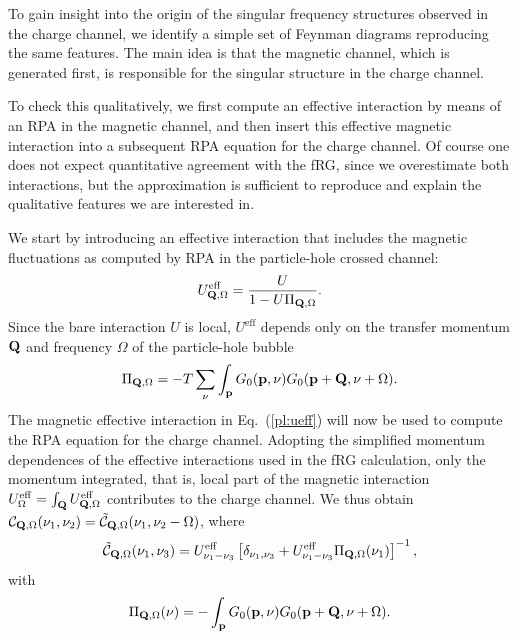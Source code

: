 To gain insight into the origin of the singular frequency structures observed in the charge channel, we identify a simple set of Feynman diagrams reproducing the same features.   
The main idea is that the magnetic channel, which is generated first, is responsible for the singular structure in the charge channel. 

To check this qualitatively, we first compute an effective interaction by means of an RPA in the magnetic channel, and then insert this effective magnetic interaction into a subsequent RPA equation for the charge channel. 
Of course one does not expect quantitative agreement with the fRG, since we overestimate both interactions, but the approximation is sufficient to reproduce and explain the qualitative features we are interested in.  
  
We start by introducing an effective interaction that includes the magnetic fluctuations as computed by RPA in the particle-hole crossed channel:
\begin{equation}
 U^{\mathrm{eff}}_{\mathbf{Q},\Omega} = \frac{U}{1 - U \Pi_{\mathbf{Q},\Omega}}.
\label{pl:ueff}
\end{equation}
Since the bare interaction $U$ is local, $U^{\mathrm{eff}}$ depends only on the transfer momentum $\mathbf{Q}$ and frequency $\Omega$ of the particle-hole bubble
\begin{equation}
 \Pi_{\mathbf{Q},\Omega} =
 - T \sum_{\nu} \int_{\mathbf{p}} G_0(\mathbf{p},\nu) G_0(\mathbf{p}+\mathbf{Q},\nu+\Omega).
\end{equation}
The magnetic effective interaction in Eq.~(\ref{pl:ueff}) will now be used to compute the RPA equation for the charge channel. Adopting the simplified momentum dependences of the effective interactions used in the fRG calculation, only the momentum integrated, that is, local part of the magnetic interaction
$U^{\mathrm{eff}}_{\Omega} = \int_{\mathbf{Q}} U^{\mathrm{eff}}_{\mathbf{Q},\Omega}$
contributes to the charge channel. We thus obtain
$\mathcal{C}_{\mathbf{Q},\Omega} (\nu_1,\nu_2) =
 \mathcal{\tilde C}_{\mathbf{Q},\Omega} (\nu_1,\nu_2 - \Omega)$, where
\begin{equation}
 \mathcal{\tilde C}_{\mathbf{Q},\Omega} (\nu_1,\nu_3) =
 U^{\mathrm{eff}}_{\nu_1-\nu_3} \left[ \delta_{\nu_1,\nu_3} + U^{\mathrm{eff}}_{\nu_1-\nu_3}
 \Pi_{\mathbf{Q},\Omega}(\nu_1) \right]^{-1} ,
 \label{pl:charge}
\end{equation}
with
\begin{equation}
 \Pi_{\mathbf{Q},\Omega}(\nu) =
 - \int_{\mathbf{p}} G_0(\mathbf{p},\nu) G_0(\mathbf{p}+\mathbf{Q},\nu+\Omega) .
\end{equation}
